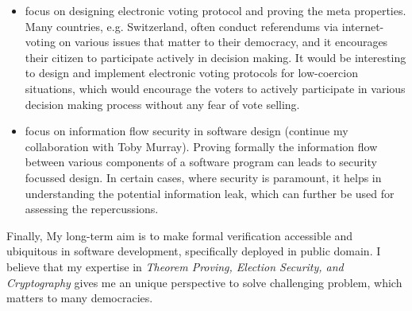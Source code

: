 \documentclass[a4paper]{article}
\begin{document}
\begin{itemize}
\item focus on designing electronic voting protocol and proving the meta properties. Many countries, e.g. Switzerland,
often conduct referendums via internet-voting on various issues that matter to their democracy, and 
it encourages their citizen to participate actively in decision making. It would be 
interesting to design and implement electronic voting protocols for low-coercion 
situations, which would  encourage the voters to actively participate in 
various decision making process without any fear of vote selling. 

\item focus on information flow security in software design (continue my collaboration with Toby Murray). 
Proving formally the information flow between various components of a software program can leads to 
security focussed design. In certain cases, where security is paramount,  
it helps in understanding the potential information leak, which can further be used 
for assessing the repercussions. 


\end{itemize}


Finally, My long-term aim is to make formal verification accessible and ubiquitous in software development, specifically deployed in public domain. 
I believe that my expertise in \textit{Theorem Proving, Election Security, and Cryptography} gives me an unique perspective to solve challenging problem, which 
matters to many democracies. 
 

\end{document}
